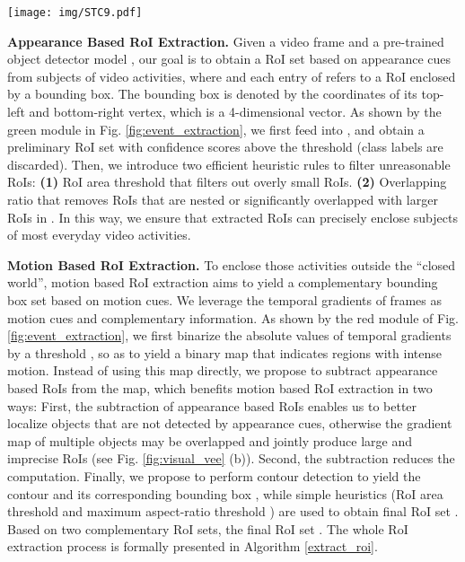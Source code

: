 \documentclass[sigconf]{acmart}
\begin{document}
\begin{figure*}
	\centering
	\texttt{[image: img/STC9.pdf]}
	\caption{Pipeline of video event extraction: \textbf{(1)} Appearance based RoI extraction (green): Appearance based RoIs are extracted with a pre-trained object detector and filtered based on efficient heuristic rules. \textbf{(2)} Motion based RoI extraction (red): First, temporal gradients are binarized by magnitude into a binary map. Then, highlighted pixels in appearance based RoIs are subtracted from the binary map. Finally, contour detection and simple heuristics are applied to the binary map for final motion based RoIs. \textbf{(3)} Spatio-temporal cube (STC) extraction (yellow): For each RoI, corresponding patches from current frame and  previous frames are extracted.  patches are then resized and stacked into a STC, which represents a video event.}
	\label{fig:event_extraction}
\end{figure*}

\textbf{Appearance Based RoI Extraction.} Given a video frame  and a pre-trained object detector model , our goal is to obtain a RoI set  based on appearance cues from subjects of video activities, where  and each entry of  refers to a RoI enclosed by a bounding box. The bounding box is denoted by the coordinates of its top-left and bottom-right vertex, which is a 4-dimensional vector. As shown by the green module in Fig. \ref{fig:event_extraction}, we first feed  into , and obtain a preliminary RoI set  with confidence scores above the threshold  (class labels are discarded). Then, we introduce two efficient heuristic rules to filter unreasonable RoIs: \textbf{(1)} RoI area threshold  that filters out overly small RoIs. \textbf{(2)} Overlapping ratio  that removes RoIs that are nested or significantly overlapped with larger RoIs in . In this way, we ensure that extracted RoIs can precisely enclose subjects of most everyday video activities.

\textbf{Motion Based RoI Extraction.} To enclose those activities outside the ``closed world'', motion based RoI extraction aims to yield a complementary bounding box set  based on motion cues. We leverage the temporal gradients of frames as motion cues and complementary information. As shown by the red module of Fig. \ref{fig:event_extraction}, we first binarize the absolute values of temporal gradients by a threshold , so as to yield a binary map that indicates regions with intense motion. Instead of using this map directly, we propose to subtract appearance based RoIs  from the map, which benefits motion based RoI extraction in two ways: First, the subtraction of appearance based RoIs enables us to better localize objects that are not detected by appearance cues, otherwise the gradient map of multiple objects may be overlapped and jointly produce large and imprecise RoIs (see Fig. \ref{fig:visual_vee} (b)). Second, the subtraction reduces the computation. Finally, we propose to perform contour detection to yield the contour and its corresponding bounding box , while simple heuristics (RoI area threshold  and maximum aspect-ratio threshold ) are used to obtain final RoI set . Based on two complementary RoI sets, the final RoI set . The whole RoI extraction process is formally presented in Algorithm \ref{extract_roi}.
\end{document}
